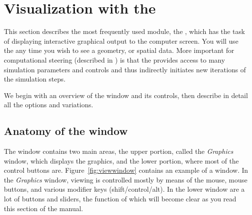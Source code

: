   \newcommand{\boxwidget}%
  {\centerline{\epsfig{file=Figures/widget-box.eps.gz,height=2in,
  bbllx=0, bblly=0, bburx=458, bbury=342}}}
\begin{htmlonly}
  \newcommand{\boxwidget}{%
  \htmladdimg[align=top,width=459,alt="boxwidget"]
  {../Figures/widget-box.gif}}
\end{htmlonly}

  \newcommand{\ringwidget}%
  {\centerline{\epsfig{file=Figures/widget-ring.eps.gz,height=2in,
  bbllx=0, bblly=0, bburx=507, bbury=467}}}
\begin{htmlonly}
  \newcommand{\ringwidget}{%
  \htmladdimg[align=top,width=508,alt="ringwidget"]
  {../Figures/widget-ring.gif}}
\end{htmlonly}

\newcommand{\graphics}{\emph{Graphics}}

\section{Visualization with the \viewer{}}
\label{sec:viewer}

This section describes the most frequently used \sr{} module,
the \viewer{}, which has the task of displaying interactive graphical
output to the computer screen.  You will use the \viewer{} any time you
wish to see a geometry, or spatial data.  More important for
computational steering (described in ) is that the \viewer{} provides access to
many simulation parameters and controls and thus indirectly initiates new
iterations of the simulation steps.

We begin with an overview of the \viewer{} window and its controls, then
describe in detail all the options and variations.

\subsection{Anatomy of the \viewer{} window}
\label{sec:viewer-anatomy} 

The \viewer{} window contains two main areas, the upper portion,
called the \graphics{} window, which displays the graphics, and the
lower portion, where most of the control buttons are.
Figure~\ref{fig:viewwindow} contains an example of a \viewer{} window.
In the \graphics{} window, viewing is controlled mostly by means of the
mouse, mouse buttons, and various modifier keys (shift/control/alt).
In the lower window are a lot of buttons and sliders, the function of
which will become clear as you read this section of the manual.

